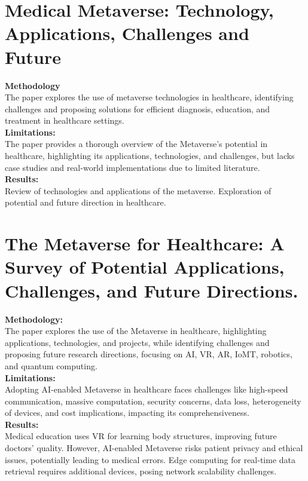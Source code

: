 \section{Medical Metaverse: Technology, Applications, Challenges and Future\cite{shao2023medical}}
\textbf{Methodology}\\The paper explores the use of metaverse technologies in healthcare, identifying challenges and proposing solutions for efficient diagnosis, education, and treatment in healthcare settings.\\
\textbf{Limitations:}\\The paper provides a thorough overview of the Metaverse's potential in healthcare, highlighting its applications, technologies, and challenges, but lacks case studies and real-world implementations due to limited literature.\\
\textbf{Results:}\\ Review of technologies and applications of the metaverse. 
Exploration of potential and future direction in healthcare.
\section{The Metaverse for Healthcare: A Survey of Potential Applications, Challenges, and Future Directions.\cite{yendurimetaverse}\cite{JournalArticle10}}
\textbf{Methodology:}\\The paper explores the use of the Metaverse in healthcare, highlighting applications, technologies, and projects, while identifying challenges and proposing future research directions, focusing on AI, VR, AR, IoMT, robotics, and quantum computing.\\
\textbf{Limitations:}\\Adopting AI-enabled Metaverse in healthcare faces challenges like high-speed communication, massive computation, security concerns, data loss, heterogeneity of devices, and cost implications, impacting its comprehensiveness.\\
\textbf{Results:}\\
Medical education uses VR for learning body structures, improving future doctors' quality. However, AI-enabled Metaverse risks patient privacy and ethical issues, potentially leading to medical errors. Edge computing for real-time data retrieval requires additional devices, posing network scalability challenges.
